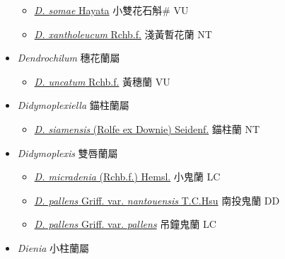\begin{itemize}
\begin{itemize}
        \item[] \href{http://www.theplantlist.org/tpl1.1/search?q=Dendrobium+somae}{\textit{D. somae} Hayata}   小雙花石斛\# VU
        \item[] \href{http://www.theplantlist.org/tpl1.1/search?q=Dendrobium+xantholeucum}{\textit{D. xantholeucum} Rchb.f.}     淺黃暫花蘭 NT
  \end{itemize}
 \item[] \textit{Dendrochilum} 穗花蘭屬
                    
  \begin{itemize}
        \item[] \href{http://www.theplantlist.org/tpl1.1/search?q=Dendrochilum+uncatum}{\textit{D. uncatum} Rchb.f.}   黃穗蘭 VU
  \end{itemize}
 \item[] \textit{Didymoplexiella} 錨柱蘭屬
                    
  \begin{itemize}
        \item[] \href{http://www.theplantlist.org/tpl1.1/search?q=Didymoplexiella+siamensis}{\textit{D. siamensis} (Rolfe ex Downie) Seidenf.}   錨柱蘭 NT
  \end{itemize}
 \item[] \textit{Didymoplexis} 雙唇蘭屬
                    
  \begin{itemize}
        \item[] \href{http://www.theplantlist.org/tpl1.1/search?q=Didymoplexis+micradenia}{\textit{D. micradenia} (Rchb.f.) Hemsl.}   小鬼蘭 LC
        \item[] \href{http://www.theplantlist.org/tpl1.1/search?q=Didymoplexis+pallens+var.+nantouensis}{\textit{D. pallens} Griff. var. \textit{nantouensis} T.C.Hsu}   南投鬼蘭 DD
        \item[] \href{http://www.theplantlist.org/tpl1.1/search?q=Didymoplexis+pallens+var.+pallens}{\textit{D. pallens} Griff. var. \textit{pallens}}   吊鐘鬼蘭 LC
  \end{itemize}
 \item[] \textit{Dienia} 小柱蘭屬
                    

\end{itemize}

